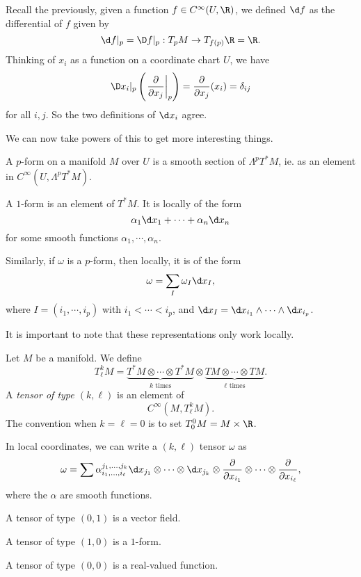 \documentclass[a4paper]{article}
\begin{document}
Recall the previously, given a function $f \in C^\infty(U, \R)$, we defined $\d f$ as the differential of $f$ given by
\[
  \d f|_p = \D f|_p: T_p M \to T_{f(p)} \R = \R.
\]
Thinking of $x_i$ as a function on a coordinate chart $U$, we have
\[
  \D x_i|_p \left(\left.\frac{\partial}{\partial x_j}\right|_p\right) = \frac{\partial}{\partial x_j}(x_i) = \delta_{ij}
\]
for all $i, j$. So the two definitions of $\d x_i$ agree.

We can now take powers of this to get more interesting things.
\begin{defi}[$p$-form]
  A $p$-form on a manifold $M$ over $U$ is a smooth section of $\Lambda^p T^*M$, ie. as an element in $C^\infty (U, \Lambda^p T^*M)$.
\end{defi}

\begin{eg}
  A $1$-form is an element of $T^* M$. It is locally of the form
  \[
    \alpha_1 \d x_1 + \cdots + \alpha_n \d x_n
  \]
  for some smooth functions $\alpha_1, \cdots, \alpha_n$.

  Similarly, if $\omega$ is a $p$-form, then locally, it is of the form
  \[
    \omega = \sum_I \omega_I \d x_I,
  \]
  where $I = (i_1, \cdots, i_p)$ with $i_1 < \cdots < i_p$, and $\d x_I = \d x_{i_1} \wedge \cdots \wedge \d x_{i_p}$.
\end{eg}
It is important to note that these representations only work locally.

\begin{defi}
  Let $M$ be a manifold. We define
  \[
    T_{\ell}^k M = \underbrace{T^*M \otimes \cdots \otimes T^* M}_{k \text{ times}} \otimes \underbrace{TM \otimes \cdots \otimes TM}_{\ell \text{ times}}.
  \]
  A \emph{tensor of type $(k, \ell)$} is an element of
  \[
    C^\infty (M, T_\ell^k M).
  \]
  The convention when $k = \ell = 0$ is to set $T_0^0 M = M \times \R$.
\end{defi}

In local coordinates, we can write a $(k, \ell)$ tensor $\omega$ as
\[
  \omega = \sum \alpha_{i_1, \ldots, i_\ell}^{j_1, \ldots, j_k} \d x_{j_1} \otimes \cdots \otimes \d x_{j_k} \otimes \frac{\partial}{\partial x_{i_1}} \otimes \cdots \otimes \frac{\partial}{\partial x_{i_\ell}},
\]
where the $\alpha$ are smooth functions.

\begin{eg}
  A tensor of type $(0, 1)$ is a vector field.

  A tensor of type $(1, 0)$ is a $1$-form.

  A tensor of type $(0, 0)$ is a real-valued function.
\end{eg}
\end{document}
